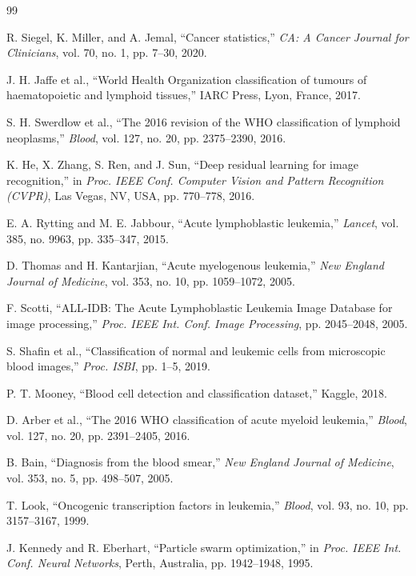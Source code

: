 \documentclass[journal]{IEEEtran}
\begin{document}
\begin{thebibliography}{99}

R. Siegel, K. Miller, and A. Jemal, ``Cancer statistics,'' \emph{CA: A Cancer Journal for Clinicians}, vol. 70, no. 1, pp. 7--30, 2020.

J. H. Jaffe et al., ``World Health Organization classification of tumours of haematopoietic and lymphoid tissues,'' IARC Press, Lyon, France, 2017.

S. H. Swerdlow et al., ``The 2016 revision of the WHO classification of lymphoid neoplasms,'' \emph{Blood}, vol. 127, no. 20, pp. 2375--2390, 2016.

K. He, X. Zhang, S. Ren, and J. Sun, ``Deep residual learning for image recognition,'' in \emph{Proc. IEEE Conf. Computer Vision and Pattern Recognition (CVPR)}, Las Vegas, NV, USA, pp. 770--778, 2016.

E. A. Rytting and M. E. Jabbour, ``Acute lymphoblastic leukemia,'' \emph{Lancet}, vol. 385, no. 9963, pp. 335--347, 2015.

D. Thomas and H. Kantarjian, ``Acute myelogenous leukemia,'' \emph{New England Journal of Medicine}, vol. 353, no. 10, pp. 1059--1072, 2005.

F. Scotti, ``ALL-IDB: The Acute Lymphoblastic Leukemia Image Database for image processing,'' \emph{Proc. IEEE Int. Conf. Image Processing}, pp. 2045--2048, 2005.

S. Shafin et al., ``Classification of normal and leukemic cells from microscopic blood images,'' \emph{Proc. ISBI}, pp. 1--5, 2019.

P. T. Mooney, ``Blood cell detection and classification dataset,'' Kaggle, 2018.

D. Arber et al., ``The 2016 WHO classification of acute myeloid leukemia,'' \emph{Blood}, vol. 127, no. 20, pp. 2391--2405, 2016.

B. Bain, ``Diagnosis from the blood smear,'' \emph{New England Journal of Medicine}, vol. 353, no. 5, pp. 498--507, 2005.

T. Look, ``Oncogenic transcription factors in leukemia,'' \emph{Blood}, vol. 93, no. 10, pp. 3157--3167, 1999.

J. Kennedy and R. Eberhart, ``Particle swarm optimization,'' in \emph{Proc. IEEE Int. Conf. Neural Networks}, Perth, Australia, pp. 1942--1948, 1995.


\end{thebibliography}
\end{document}
